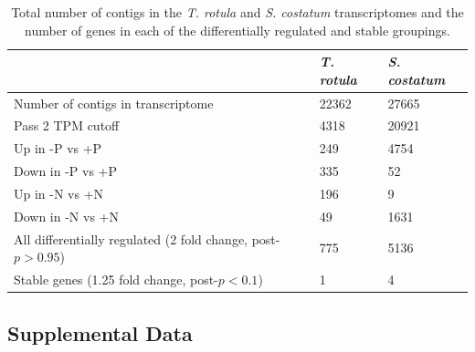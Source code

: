 \begin{table}[h!]
\centering
\caption[Mapping statistics for \textit{T. rotula} and \textit{S. costatum} transcriptomes]{Total number of contigs in the \textit{T. rotula} and \textit{S. costatum} transcriptomes and the number of genes in each of the differentially regulated and stable groupings.}
\label{tab:a3t3}
\begin{tabular}{|l|l|l|}
\hline
                                                                       & \textit{\textbf{T. rotula}} & \textit{\textbf{S. costatum}} \\ \hline
Number of contigs in transcriptome                                     & 22362                       & 27665                         \\ \hline
Pass 2 TPM cutoff                                                      & 4318                        & 20921                         \\ \hline
Up in -P vs +P                                                         & 249                         & 4754                          \\ \hline
Down in -P vs +P                                                       & 335                         & 52                            \\ \hline
Up in -N vs +N                                                         & 196                         & 9                             \\ \hline
Down in -N vs +N                                                       & 49                          & 1631                          \\ \hline
All differentially regulated (2 fold change, post-$p > 0.95$) & 775                         & 5136                          \\ \hline
Stable genes (1.25 fold change, post-$p < 0.1$)                  & 1                           & 4                             \\ \hline
\end{tabular}
\end{table}

\clearpage

\subsection{Supplemental Data}


